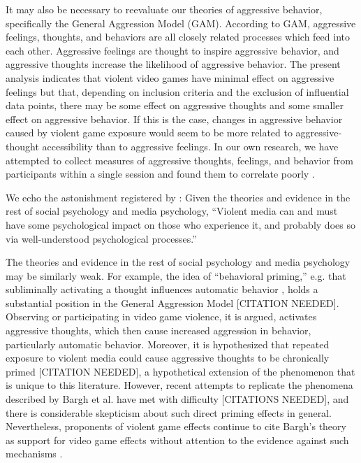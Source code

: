 \documentclass[man]{apa6}
\begin{document}
It may also be necessary to reevaluate our theories of aggressive behavior, specifically the General Aggression Model (GAM). According to GAM, aggressive feelings, thoughts, and behaviors are all closely related processes which feed into each other. Aggressive feelings are thought to inspire aggressive behavior, and aggressive thoughts increase the likelihood of aggressive behavior. The present analysis indicates that violent video games have minimal effect on aggressive feelings \citep[a finding paralleled by][]{Przybylski:etal:2014} but that, depending on inclusion criteria and the exclusion of influential data points, there may be some effect on aggressive thoughts and some smaller effect on aggressive behavior. If this is the case, changes in aggressive behavior caused by violent game exposure would seem to be more related to aggressive-thought accessibility than to aggressive feelings. In our own research, we have attempted to collect measures of aggressive thoughts, feelings, and behavior from participants within a single session and found them to correlate poorly \citep{Engelhardt:etal:2015}.

We echo the astonishment registered by \citet[p. 62]{Warburton:2014}: Given the theories and evidence in the rest of social psychology and media psychology, ``Violent media can and must have some psychological impact on those who experience it, and probably does so via well-understood psychological processes.'' 

The theories and evidence in the rest of social psychology and media psychology may be similarly weak. For example, the idea of ``behavioral priming,'' e.g. that subliminally activating a thought influences automatic behavior \citep{Bargh:etal:1996}, holds a substantial position in the General Aggression Model [CITATION NEEDED]. Observing or participating in video game violence, it is argued, activates aggressive thoughts, which then cause increased aggression in behavior, particularly automatic behavior. Moreover, it is hypothesized that repeated exposure to violent media could cause aggressive thoughts to be chronically primed [CITATION NEEDED], a hypothetical extension of the phenomenon that is unique to this literature. However, recent attempts to replicate the phenomena described by Bargh et al. have met with difficulty [CITATIONS NEEDED], and there is considerable skepticism about such direct priming effects in general. Nevertheless, proponents of violent game effects continue to cite Bargh's theory as support for video game effects without attention to the evidence against such mechanisms \citep{Prot:Anderson:2013,Anderson:etal:2015}. %
\end{document}
